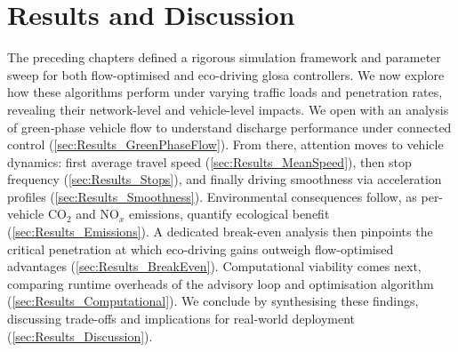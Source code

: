\chapter{Results and Discussion}
\label{ch:ResultsDiscussion}

The preceding chapters defined a rigorous simulation framework and parameter sweep for both flow-optimised and eco-driving \ac{glosa} controllers. We now explore how these algorithms perform under varying traffic loads and penetration rates, revealing their network-level and vehicle-level impacts.  
We open with an analysis of green‐phase vehicle flow to understand discharge performance under connected control (\ref{sec:Results_GreenPhaseFlow}). From there, attention moves to vehicle dynamics: first average travel speed (\ref{sec:Results_MeanSpeed}), then stop frequency (\ref{sec:Results_Stops}), and finally driving smoothness via acceleration profiles (\ref{sec:Results_Smoothness}). Environmental consequences follow, as per-vehicle CO$_2$ and NO$_x$ emissions, quantify ecological benefit (\ref{sec:Results_Emissions}). A dedicated break-even analysis then pinpoints the critical penetration at which eco-driving gains outweigh flow-optimised advantages (\ref{sec:Results_BreakEven}). Computational viability comes next, comparing runtime overheads of the advisory loop and optimisation algorithm (\ref{sec:Results_Computational}). We conclude by synthesising these findings, discussing trade-offs and implications for real-world deployment (\ref{sec:Results_Discussion}).  















